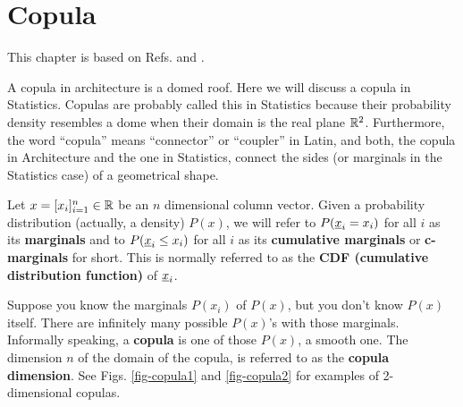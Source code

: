 \chapter{Copula}
\label{ch-copula}

This chapter is based 
on Refs.\cite{wiki-copula}
and \cite{copula-bo}.

A copula in architecture is a domed roof. Here we will discuss a copula in Statistics.
Copulas are probably called this in Statistics
because their probability density resembles a dome when their domain is 
the real plane ${ \mathbb{R}}^2$.
Furthermore,
the word \enquote{copula} means
\enquote{connector} or \enquote{coupler} in Latin,
and both,
the copula in Architecture
and the one in Statistics,
connect the sides (or marginals in the
Statistics case) of a geometrical 
shape.

Let $x= [x_i]_{i=1}^n\in{ \mathbb{R}}$ be an $n$ 
dimensional column vector.
Given a probability
distribution (actually, a density) $P(x)$,
we will refer to $P({\underline{x}}_i=x_i)$ for all $i$
as its {\bf marginals}
and to $P({\underline{x}}_i\leq x_i)$ for all $i$
as its {\bf cumulative marginals} or {\bf c-marginals} for short.
This is normally referred
to as the {\bf CDF (cumulative
distribution function)} of ${\underline{x}}_i$.

Suppose you know the marginals $P(x_i)$ 
of  $P(x)$,
but you don't know $P(x)$
itself. There are
infinitely many
possible $P(x)$'s
with those marginals.
Informally
speaking,
a {\bf copula} is one of those
$P(x)$, a smooth one.
The dimension $n$ of
the domain of the copula,
is referred to as the
{\bf copula dimension}.
See Figs. \ref{fig-copula1}
and \ref{fig-copula2}
for examples of 2-dimensional copulas.

